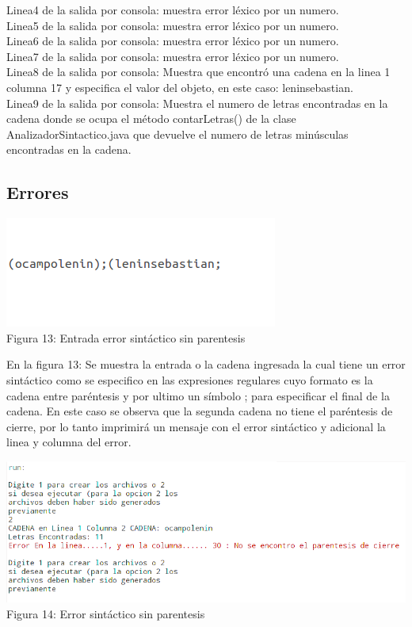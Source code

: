 \documentclass[a4paper,openright,12pt]{article}
\begin{document}
Linea4 de la salida por consola:  muestra error léxico por un numero.\\

Linea5 de la salida por consola:  muestra error léxico por un numero.\\

Linea6 de la salida por consola:  muestra error léxico por un numero.\\

Linea7 de la salida por consola:  muestra error léxico por un numero.\\

Linea8 de la salida por consola: Muestra que encontró una cadena en la linea 1 columna 17 y especifica el valor del objeto, en este caso: leninsebastian.\\

Linea9 de la salida por consola: Muestra el numero de letras encontradas en la cadena donde se ocupa el método contarLetras() de la clase AnalizadorSintactico.java que devuelve el numero de letras minúsculas encontradas en la cadena. 

\subsection{Errores}

\begin{center}
\includegraphics[height=0.15\textheight]{entradaerror.png}
\\
Figura 13: Entrada error sintáctico sin parentesis
\end{center}


En la figura 13: Se muestra la entrada o la cadena ingresada la cual tiene un error sintáctico como se especifico en las expresiones regulares cuyo formato es la cadena entre paréntesis y por ultimo un símbolo ; para especificar el final de la cadena. En este caso se observa que la segunda cadena no tiene  el paréntesis de cierre, por lo tanto imprimirá un mensaje con el error sintáctico y adicional la linea y columna del error. 

\begin{center}
\includegraphics[height=0.25\textheight]{error.png}
\\
Figura 14: Error sintáctico sin parentesis
\end{center}
\end{document}
